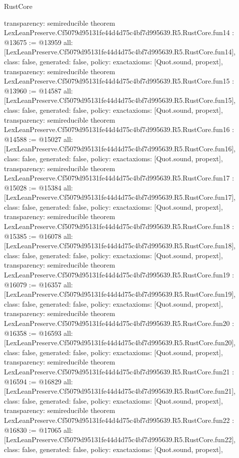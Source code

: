 \begin{lexlean}{RustCore}
\begin{coremodule}
{  transparency: semireducible
}
theorem LexLeanPreserve.Cf5079d95131fe44d4d75c4bf7d995639.R5.RustCore.fun14 : @13675 := @13959 {
  all: [LexLeanPreserve.Cf5079d95131fe44d4d75c4bf7d995639.R5.RustCore.fun14],
  class: false,
  generated: false,
  policy: exact{axioms: [Quot.sound, propext]},
  transparency: semireducible
}
theorem LexLeanPreserve.Cf5079d95131fe44d4d75c4bf7d995639.R5.RustCore.fun15 : @13960 := @14587 {
  all: [LexLeanPreserve.Cf5079d95131fe44d4d75c4bf7d995639.R5.RustCore.fun15],
  class: false,
  generated: false,
  policy: exact{axioms: [Quot.sound, propext]},
  transparency: semireducible
}
theorem LexLeanPreserve.Cf5079d95131fe44d4d75c4bf7d995639.R5.RustCore.fun16 : @14588 := @15027 {
  all: [LexLeanPreserve.Cf5079d95131fe44d4d75c4bf7d995639.R5.RustCore.fun16],
  class: false,
  generated: false,
  policy: exact{axioms: [Quot.sound, propext]},
  transparency: semireducible
}
theorem LexLeanPreserve.Cf5079d95131fe44d4d75c4bf7d995639.R5.RustCore.fun17 : @15028 := @15384 {
  all: [LexLeanPreserve.Cf5079d95131fe44d4d75c4bf7d995639.R5.RustCore.fun17],
  class: false,
  generated: false,
  policy: exact{axioms: [Quot.sound, propext]},
  transparency: semireducible
}
theorem LexLeanPreserve.Cf5079d95131fe44d4d75c4bf7d995639.R5.RustCore.fun18 : @15385 := @16078 {
  all: [LexLeanPreserve.Cf5079d95131fe44d4d75c4bf7d995639.R5.RustCore.fun18],
  class: false,
  generated: false,
  policy: exact{axioms: [Quot.sound, propext]},
  transparency: semireducible
}
theorem LexLeanPreserve.Cf5079d95131fe44d4d75c4bf7d995639.R5.RustCore.fun19 : @16079 := @16357 {
  all: [LexLeanPreserve.Cf5079d95131fe44d4d75c4bf7d995639.R5.RustCore.fun19],
  class: false,
  generated: false,
  policy: exact{axioms: [Quot.sound, propext]},
  transparency: semireducible
}
theorem LexLeanPreserve.Cf5079d95131fe44d4d75c4bf7d995639.R5.RustCore.fun20 : @16358 := @16593 {
  all: [LexLeanPreserve.Cf5079d95131fe44d4d75c4bf7d995639.R5.RustCore.fun20],
  class: false,
  generated: false,
  policy: exact{axioms: [Quot.sound, propext]},
  transparency: semireducible
}
theorem LexLeanPreserve.Cf5079d95131fe44d4d75c4bf7d995639.R5.RustCore.fun21 : @16594 := @16829 {
  all: [LexLeanPreserve.Cf5079d95131fe44d4d75c4bf7d995639.R5.RustCore.fun21],
  class: false,
  generated: false,
  policy: exact{axioms: [Quot.sound, propext]},
  transparency: semireducible
}
theorem LexLeanPreserve.Cf5079d95131fe44d4d75c4bf7d995639.R5.RustCore.fun22 : @16830 := @17065 {
  all: [LexLeanPreserve.Cf5079d95131fe44d4d75c4bf7d995639.R5.RustCore.fun22],
  class: false,
  generated: false,
  policy: exact{axioms: [Quot.sound, propext]},
}
\end{coremodule}
\end{lexlean}
